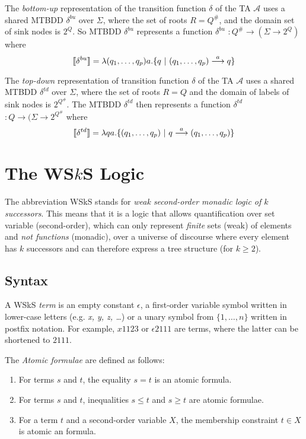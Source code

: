 The \emph{bottom-up} representation of the transition function $\delta$ of the TA $\mathcal{A}$ uses a shared MTBDD $\delta^{bu}$ over $\Sigma$, where the set of roots $R = Q^\#$, and the domain set of sink nodes is $2^Q$. So MTBDD $\delta^{bu}$ represents a function \textlbrackdbl $\delta^{bu}$ \textrbrackdbl $: Q^\# \rightarrow (\Sigma \rightarrow 2^Q)$ where
 $$\text{\textlbrackdbl} \delta^{bu} \text{\textrbrackdbl} = \lambda (q_1,\ldots,q_p) a . \{q\ |\ (q_1,\ldots,q_p) \overset{a}{\longrightarrow} q\} $$

The \emph{top-down} representation of transition function $\delta$ of the TA $\mathcal{A}$ uses a shared MTBDD $\delta^{td}$ over $\Sigma$, where the set of roots $R = Q$ and the domain of labels of sink nodes is $2^{Q^\#}$. The MTBDD $\delta^{td}$ then represents a function \textlbrackdbl $\delta^{td}$ \textrbrackdbl $: Q \rightarrow (\Sigma \rightarrow 2^{Q^\#}$ where $$\text{\textlbrackdbl} \delta^{td} \text{\textrbrackdbl} = \lambda q a . \{(q_1,\ldots,q_p)\ |\ q \overset{a}{\longrightarrow} (q_1,\ldots,q_p)\}$$

\chapter{The WS$k$S Logic}\label{wsks}
The abbreviation WSkS stands for \emph{weak second-order monadic logic of $k$ successors}. This means that it is a logic that allows quantification over set variable (second-order), which can only represent \emph{finite} sets (weak) of elements and \emph{not functions} (monadic), over a universe of discourse where every element has $k$ successors and can therefore express a tree structure (for $k \geq 2$).
 
 \section{Syntax}
 A WSkS \emph{term} is an empty constant $\epsilon$, a first-order variable symbol written in lower-case letters (e.g. \emph{x, y, z,
 \ldots}) or a unary symbol from $\{1,\ldots,n\}$ written in postfix notation. For example, $x1123$ or $\epsilon2111$ are terms, where the latter can be shortened to $2111$.

The \emph{Atomic formulae} are defined as follows:
 \begin{enumerate}
  \item For terms $s$ and $t$, the equality $s = t$ is an atomic formula.
	\item For terms $s$ and $t$, inequalities $s \leq t$ and $s \geq t$ are atomic formulae.
	\item For a term $t$ and a second-order variable $X$, the membership constraint $t \in X$ is atomic an formula.
 \end{enumerate}

